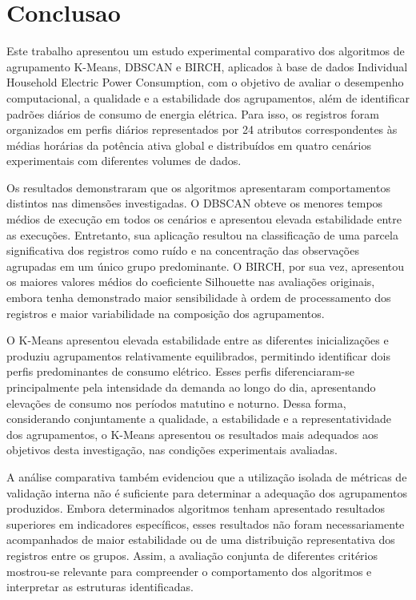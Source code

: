 \documentclass[lettersize,journal]{IEEEtran}
\begin{document}
\section{Conclusao}
\label{sec:conclusao}
Este trabalho apresentou um estudo experimental comparativo dos algoritmos de agrupamento K-Means, DBSCAN e BIRCH, aplicados à base de dados Individual Household Electric Power Consumption, com o objetivo de avaliar o desempenho computacional, a qualidade e a estabilidade dos agrupamentos, além de identificar padrões diários de consumo de energia elétrica. Para isso, os registros foram organizados em perfis diários representados por 24 atributos correspondentes às médias horárias da potência ativa global e distribuídos em quatro cenários experimentais com diferentes volumes de dados.

Os resultados demonstraram que os algoritmos apresentaram comportamentos distintos nas dimensões investigadas. O DBSCAN obteve os menores tempos médios de execução em todos os cenários e apresentou elevada estabilidade entre as execuções. Entretanto, sua aplicação resultou na classificação de uma parcela significativa dos registros como ruído e na concentração das observações agrupadas em um único grupo predominante. O BIRCH, por sua vez, apresentou os maiores valores médios do coeficiente Silhouette nas avaliações originais, embora tenha demonstrado maior sensibilidade à ordem de processamento dos registros e maior variabilidade na composição dos agrupamentos.

O K-Means apresentou elevada estabilidade entre as diferentes inicializações e produziu agrupamentos relativamente equilibrados, permitindo identificar dois perfis predominantes de consumo elétrico. Esses perfis diferenciaram-se principalmente pela intensidade da demanda ao longo do dia, apresentando elevações de consumo nos períodos matutino e noturno. Dessa forma, considerando conjuntamente a qualidade, a estabilidade e a representatividade dos agrupamentos, o K-Means apresentou os resultados mais adequados aos objetivos desta investigação, nas condições experimentais avaliadas.

A análise comparativa também evidenciou que a utilização isolada de métricas de validação interna não é suficiente para determinar a adequação dos agrupamentos produzidos. Embora determinados algoritmos tenham apresentado resultados superiores em indicadores específicos, esses resultados não foram necessariamente acompanhados de maior estabilidade ou de uma distribuição representativa dos registros entre os grupos. Assim, a avaliação conjunta de diferentes critérios mostrou-se relevante para compreender o comportamento dos algoritmos e interpretar as estruturas identificadas.
\end{document}
